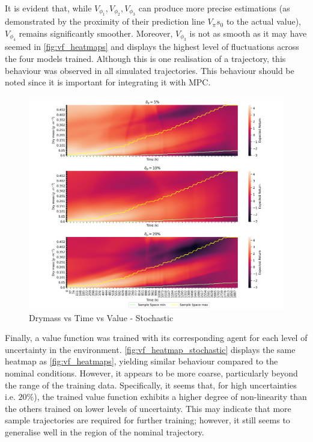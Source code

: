\begin{remark}\label{rem:vf-smoothness}
	It is evident that, while $V_{\phi_1}, V_{\phi_2}, V_{\phi_3}$ can produce more precise estimations (as demonstrated by the proximity of their prediction line $V_{\pi}{s_0}$ to the actual value), $V_{\phi_4}$ remains significantly smoother. Moreover, $V_{\phi_3}$  is not as smooth as it may have seemed in \autoref{fig:vf_heatmaps} and displays the highest level of fluctuations across the four models trained. Although this is one realisation of a trajectory, this behaviour was observed in all simulated trajectories. This behaviour should be noted since it is important for integrating it with MPC.
\end{remark}



\begin{figure}[H]
	\centering
	\includegraphics[width = \textwidth]{figures/vf_heatmap_stochastic_test.png}
	\caption{Drymass vs Time vs Value - Stochastic}
	\label{fig:vf_heatmap_stochastic}
\end{figure}


Finally, a value function was trained with its corresponding agent for each level of uncertainty in the environment. \autoref{fig:vf_heatmap_stochastic} displays the same heatmap as \autoref{fig:vf_heatmaps}, yielding similar behaviour compared to the nominal conditions. However, it appears to be more coarse, particularly beyond the range of the training data. Specifically, it seems that, for high uncertainties i.e. $20\%$), the trained value function exhibits a higher degree of non-linearity than the others trained on lower levels of uncertainty. This may indicate that more sample trajectories are required for further training; however, it still seems to generalise well in the region of the nominal trajectory.

